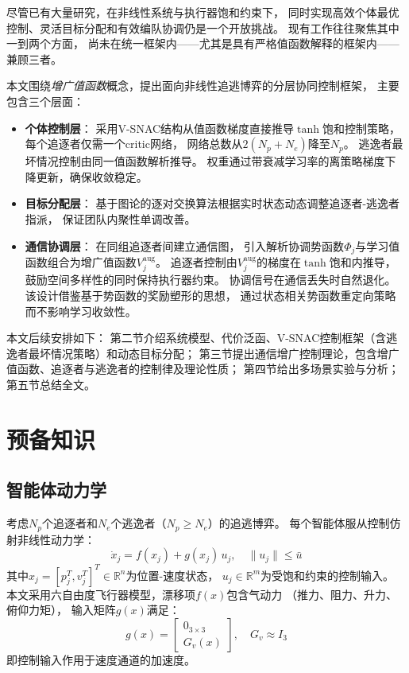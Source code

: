 \documentclass[conference]{IEEEtran}
\begin{document}
尽管已有大量研究，在非线性系统与执行器饱和约束下，
同时实现高效个体最优控制、灵活目标分配和有效编队协调仍是一个开放挑战。
现有工作往往聚焦其中一到两个方面，
尚未在统一框架内——尤其是具有严格值函数解释的框架内——兼顾三者。

本文围绕\emph{增广值函数}概念，提出面向非线性追逃博弈的分层协同控制框架，
主要包含三个层面：
\begin{itemize}
\item \textbf{个体控制层}：
  采用V-SNAC结构从值函数梯度直接推导$\tanh$饱和控制策略，
  每个追逐者仅需一个critic网络，
  网络总数从$2(N_p + N_e)$降至$N_p$。
  逃逸者最坏情况控制由同一值函数解析推导。
  权重通过带衰减学习率的离策略梯度下降更新，确保收敛稳定。
\item \textbf{目标分配层}：
  基于图论的逐对交换算法根据实时状态动态调整追逐者-逃逸者指派，
  保证团队内聚性单调改善。
\item \textbf{通信协调层}：
  在同组追逐者间建立通信图，
  引入解析协调势函数$\Phi_j$与学习值函数组合为增广值函数$V_j^{\mathrm{aug}}$。
  追逐者控制由$V_j^{\mathrm{aug}}$的梯度在$\tanh$饱和内推导，
  鼓励空间多样性的同时保持执行器约束。
  协调信号在通信丢失时自然退化。
  该设计借鉴基于势函数的奖励塑形\cite{b_ng1999}的思想，
  通过状态相关势函数重定向策略而不影响学习收敛性。
\end{itemize}

本文后续安排如下：
第二节介绍系统模型、代价泛函、V-SNAC控制框架（含逃逸者最坏情况策略）和动态目标分配；
第三节提出通信增广控制理论，包含增广值函数、追逐者与逃逸者的控制律及理论性质；
第四节给出多场景实验与分析；
第五节总结全文。


\section{预备知识}

\subsection{智能体动力学}

考虑$N_p$个追逐者和$N_e$个逃逸者（$N_p \geq N_e$）的追逃博弈。
每个智能体服从控制仿射非线性动力学：
\begin{equation}\label{eq:dynamics}
\dot{x}_j = f(x_j) + g(x_j)\,u_j, \quad \|u_j\| \leq \bar{u}
\end{equation}
其中$x_j = [p_j^T, v_j^T]^T \in \mathbb{R}^n$为位置-速度状态，
$u_j \in \mathbb{R}^m$为受饱和约束的控制输入。
本文采用六自由度飞行器模型，漂移项$f(x)$包含气动力
（推力、阻力、升力、俯仰力矩），
输入矩阵$g(x)$满足：
\begin{equation}\label{eq:g_struct}
g(x) = \begin{bmatrix} 0_{3\times 3} \\ G_v(x) \end{bmatrix},
\quad G_v \approx I_3
\end{equation}
即控制输入作用于速度通道的加速度。
\end{document}
